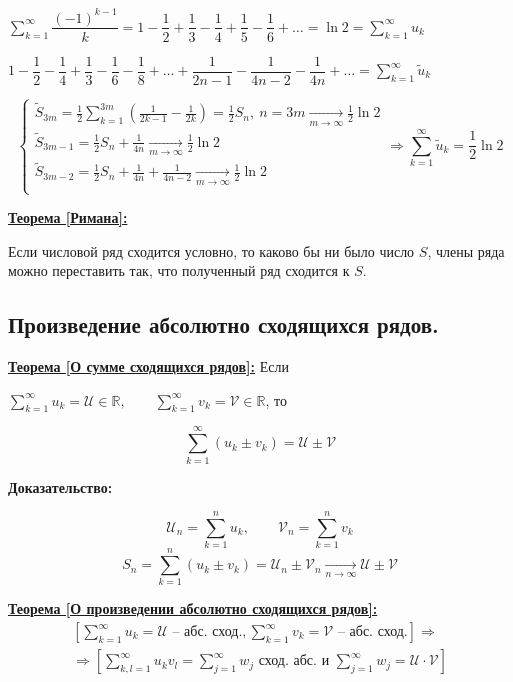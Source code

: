 \documentclass[a4paper,12pt]{article} %
\newcommand{\R}{\mathbb{R}}
\newcommand{\series}{\sum\limits_{k=1}^{\infty}}
\newcommand{\useries}{\sum\limits_{k=1}^{\infty} u_k}
\newcommand{\sn}{\sum\limits_{k=1}^{n} u_k}
\begin{document}
$\series \dfrac{(-1)^{k-1}}{k} = 1 - \dfrac{1}{2} + \dfrac{1}{3} - \dfrac{1}{4} + \dfrac{1}{5} - \dfrac{1}{6} + \ldots = \ln 2 = \useries$

$1 - \dfrac{1}{2} - \dfrac{1}{4} + \dfrac{1}{3} - \dfrac{1}{6} - \dfrac{1}{8} + \ldots + \dfrac{1}{2n-1} - \dfrac{1}{4n-2} - \dfrac{1}{4n} + \ldots = \sum\limits_{k=1}^{\infty} \tilde{u}_k$

\begin{equation*}
	\begin{cases}
		\tilde{S}_{3m} = \frac{1}{2} \sum\limits_{k=1}^{3m}\left( \frac{1}{2k-1} - \frac{1}{2k} \right) = \frac{1}{2} S_{n}, \ n=3m \xrightarrow[m \to \infty]{} \frac{1}{2} \ln 2\\
		\tilde{S}_{3m - 1} = \frac{1}{2} S_n + \frac{1}{4n} \xrightarrow[m \to \infty]{} \frac{1}{2} \ln 2 \\
		\tilde{S}_{3m - 2} = \frac{1}{2} S_n + \frac{1}{4n} + \frac{1}{4n-2} \xrightarrow[m \to \infty]{} \frac{1}{2} \ln 2 \\
	\end{cases}
	\Rightarrow \sum\limits_{k=1}^{\infty} \tilde{u}_k = \dfrac{1}{2} \ln 2
\end{equation*}

\underline{\textbf{Теорема [Римана]:}}

Если числовой ряд сходится условно, то каково бы ни было число $S$, члены ряда можно переставить так, что полученный ряд сходится к $S$.

\subsection{Произведение абсолютно сходящихся рядов.}

\underline{\textbf{Теорема [О сумме сходящихся рядов]:}} Если

$\useries = \mathscr{U} \in \R, \hspace{2em} \series v_k = \mathscr{V} \in \R$, то

\[ \series (u_k \pm v_k) = \mathscr{U} \pm \mathscr{V} \]

\textbf{Доказательство:}

\[ \mathscr{U}_n = \sn, \hspace{2em} \mathscr{V}_n = \sum\limits_{k=1}^{n}v_k \]
\[ S_n = \sum\limits_{k=1}^{n}(u_k \pm v_k) = \mathscr{U}_n \pm \mathscr{V}_n \xrightarrow[n \to \infty]{} \mathscr{U} \pm \mathscr{V} \]

\underline{\textbf{Теорема [О произведении абсолютно сходящихся рядов]:}}
\begin{multline*}
	\left[ \useries = \mathscr{U} \text{ -- абс. сход.}, \sum\limits_{k=1}^{\infty}v_k = \mathscr{V} \text{ -- абс. сход.} \right] \Rightarrow \\ \Rightarrow \left[ \sum\limits_{k, l =1}^{\infty}u_k v_l = \sum\limits_{j=1}^{\infty} w_j \text{ сход. абс. и } \sum\limits_{j=1}^{\infty} w_j = \mathscr{U} \cdot \mathscr{V} \right]
\end{multline*}
\end{document}
